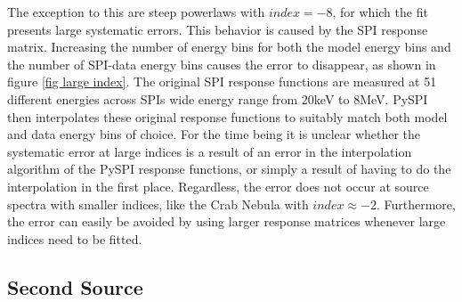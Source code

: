 \documentclass{report}
\begin{document}
The exception to this are steep powerlaws with $index=-8$, for which the fit presents large systematic errors. This behavior is caused by the SPI response matrix. Increasing the number of energy bins for both the model energy bins and the number of SPI-data energy bins causes the error to disappear, as shown in figure \ref{fig large index}. The original SPI response functions are measured at 51 different energies across SPIs wide energy range from 20keV to 8MeV. PySPI then interpolates these original response functions to suitably match both model and data energy bins of choice. For the time being it is unclear whether the systematic error at large indices is a result of an error in the interpolation algorithm of the PySPI response functions, or simply a result of having to do the interpolation in the first place. Regardless, the error does not occur at source spectra with smaller indices, like the Crab Nebula with $index\approx-2$. Furthermore, the error can easily be avoided by using larger response matrices whenever large indices need to be fitted.





\subsection{Second Source}
\end{document}
